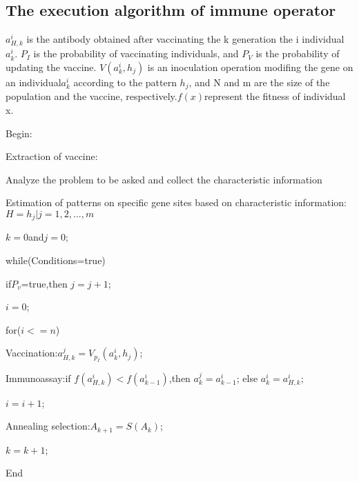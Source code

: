 \documentclass{article}
\begin{document}
\subsection{The execution algorithm of immune operator}
$a_{H,k}^i$ is the antibody obtained after vaccinating the k generation the i individual $a_k^i$. $P_I$ is the probability of vaccinating individuals, and $P_V$ is the probability of updating the vaccine. $V(a_k^i,h_j)$ is an inoculation operation modifing the gene on an individual$a_k^i$ according to the pattern $h_j$,  and N and m are the size of the population and the vaccine, respectively.$f(x)$represent the fitness of individual x.



\par\setlength\parindent{6em}
Begin:
\par\setlength\parindent{6em}
Extraction of vaccine:
  \par\setlength\parindent{8em}
  Analyze the problem to be asked and collect the characteristic information
  \par\setlength\parindent{8em}
  Estimation of patterns on specific gene sites based on characteristic information:$H={h_j|j=1,2,...,m}$
   \par\setlength\parindent{6em}
   $k=0$and$j=0$;
   \par\setlength\parindent{6em}
   while(Conditions=true)
   \par\setlength\parindent{7em}
    if{$P_v$}=true,then $j=j+1$;
    \par\setlength\parindent{7em}
    $i=0$;
    \par\setlength\parindent{7em}
    for($i<=n$)
    \par\setlength\parindent{8em}
    Vaccination:$a_{H,k}^j=V_{p_I}{(a_k^i,h_j)}$;
    \par\setlength\parindent{8em}
    Immunoassay:if $f(a_{H,k}^i)<f(a_{k-1}^i)$,then $a_k^j=a_{k-1}^i$;
    else $a_k^i=a_{H,k}^i$;
    \par\setlength\parindent{8em}
    $i=i+1$;
    \par\setlength\parindent{7em}
    Annealing selection:$A_{k+1}=S(A_k)$;
    \par\setlength\parindent{7em}
    $k=k+1$;
    
    End
\end{document}
